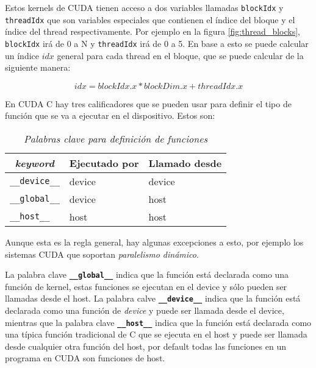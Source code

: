 Estos kernels de CUDA tienen acceso a dos variables llamadas \texttt{blockIdx} y \texttt{threadIdx} que son variables
especiales que contienen el índice del bloque y el índice del thread respectivamente. Por ejemplo en la figura
\ref{fig:thread_blocks}, \texttt{blockIdx} irá de 0 a N y \texttt{threadIdx} irá de 0 a 5. En base a esto se puede
calcular un índice $idx$ general para cada thread en el bloque, que se puede calcular de la siguiente manera:

\[
  idx = blockIdx.x * blockDim.x + threadIdx.x
\]

En CUDA C hay tres calificadores que se pueden usar para definir el tipo de función que se va a ejecutar en el
dispositivo. Estos son:

\begin{table}[H]
  \caption{\textit{Palabras clave para definición de funciones}}\label{tab:function_keywords}
  \begin{center}
    \begin{tabular}[c]{l|l|l}
      \hline
      \multicolumn{1}{c|}{\textbf{\textit{keyword}}} & \multicolumn{1}{c}{\textbf{Ejecutado por}} & \multicolumn{1}{c}{\textbf{Llamado
      desde}} \\
      \hline
      \texttt{\_\_device\_\_} & device & device \\
      \texttt{\_\_global\_\_} & device & host \\
      \texttt{\_\_host\_\_} & host & host \\
      \hline
    \end{tabular}
  \end{center}
\end{table}

Aunque esta es la regla general, hay algunas excepciones a esto, por ejemplo los sistemas CUDA que soportan
\textit{paralelismo dinámico}.

La palabra clave \textbf{\texttt{\_\_global\_\_}} indica que la función está declarada como una función de kernel, estas
funciones se ejecutan en el device y sólo pueden ser llamadas desde el host. La palabra calve
\textbf{\texttt{\_\_device\_\_}} indica que la función está declarada como una función de \textit{device} y puede ser
llamada desde el device, mientras que la palabra clave \textbf{\texttt{\_\_host\_\_}} indica que la función está
declarada como una típica función tradicional de C que se ejecuta en el host y puede ser llamada desde cualquier otra
función del host, por default todas las funciones en un programa en CUDA son funciones de host.

